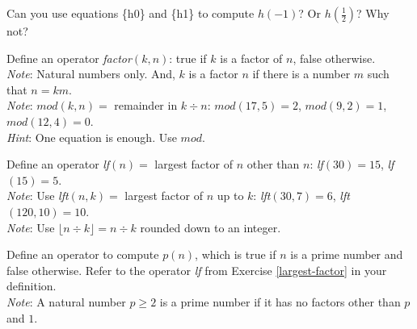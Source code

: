 \begin{ExerciseList}
\Exercise Can you use equations \{h0\} and \{h1\}
to compute $h(-1)$?  Or $h(\frac{1}{2})$? Why not?

\Exercise Define an operator \emph{factor}$(k, n)$: true
if $k$ is a factor of $n$, false otherwise.\\
\emph{Note}: Natural numbers only. And,
$k$ is a factor $n$
if there is a number $m$ such that $n = km$.\\
\emph{Note}: $mod(k,n) =$ remainder
in $k \div n$: $mod(17,5)=2$, $mod(9,2)=1$, $mod(12,4)=0$.\\
\emph{Hint}: One equation is enough. Use $mod$.

\Exercise \label{largest-factor}
        Define an operator \emph{lf}$(n) =$
        largest factor of $n$ other than $n$:
        \emph{lf}$(30)=15$, \emph{lf}$(15)=5$.\\
        \emph{Note}: Use \emph{lft}$(n,k) =$ largest factor of
        $n$ up to $k$:
        \emph{lft}$(30,7)=6$, \emph{lft}$(120,10)=10$.\\
        \emph{Note}: Use $\lfloor n \div k\rfloor = n \div k$ rounded down to an integer.

\Exercise \label{prime-predicate}
        Define an operator to compute $p(n)$, which is true
        if $n$ is a prime number and false otherwise.
        Refer to the operator \emph{lf}
        from Exercise \ref{largest-factor} in your definition.\\
        \emph{Note}: A natural number $p \geq 2$ is a prime number if
        it has no factors other than $p$ and $1$.


\end{ExerciseList}
